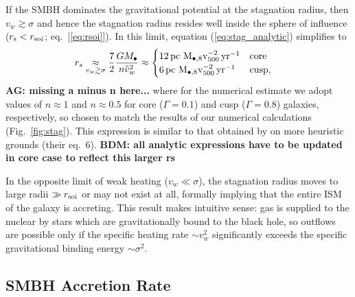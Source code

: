 \documentclass[usenatbib,fleqn]{mn2e}
\newcommand{\rs}{r_s}
\newcommand{\pc}{\rm pc}
\newcommand{\Mbh}[1][]{M_{\bullet#1}}
\newcommand{\Mbheight}{M_{\bullet,8}}
\newcommand{\pyear}{{\rm yr}^{-1}}
\begin{document}
If the SMBH dominates the gravitational potential at the stagnation radius, then $v_{w} \gtrsim \sigma$ and hence the stagnation radius resides well inside the sphere of influence ($r_{\rm s} < r_{\rm soi}$; eq.~[\ref{eq:rsoi}]).  In this limit, equation (\ref{eq:stag_analytic}) simplifies to
\begin{eqnarray}
  &\rs \underset{v_w \gtrsim \sigma}\approx \frac{7}{2}\frac{G \Mbh}{n \tilde{v}_{w}^{2}} \approx \begin{cases}
    12
 \, \pc \,\, \Mbheight v_{500}^{-2}\, \pyear& \text{core} \\
    6
 \, \pc \,\, \Mbheight v_{500}^{-2} \, \pyear  & \text{cusp}, 
  \end{cases}
  \label{eq:stag_simple}
\end{eqnarray}
{\bf AG: missing a minus n here...}
where for the numerical estimate we adopt values of $n \approx 1$ and $n \approx 0.5$ for core ($\Gamma = 0.1$) and cusp ($\Gamma = 0.8$) galaxies, respectively, so chosen to match the results of our numerical calculations (Fig.~\ref{fig:stag}).  This expression is similar to that obtained by \citet{Volonteri+11} on more heuristic grounds (their eq.~6).  {\bf BDM: all analytic expressions have to be updated in core case to reflect this larger rs}

In the opposite limit of weak heating ($v_{w} \ll \sigma$), the stagnation radius moves to large radii $\gg r_{\rm soi}$ or may not exist at all, formally implying that the entire ISM of the galaxy is accreting.  This result makes intuitive sense: gas is supplied to the nuclear by stars which are gravitationally bound to the black hole, so outflows are possible only if the specific heating rate $\sim v_{w}^{2}$ significantly exceeds the specific gravitational binding energy $\sim \sigma^{2}$.


\subsection{SMBH Accretion Rate}
\end{document}
